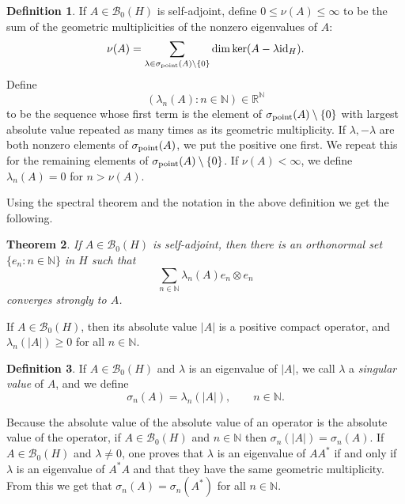 \documentclass{article}
\newcommand{\id}{\ensuremath\mathrm{id}}
\newcommand{\point}{\ensuremath\sigma_{\mathrm{point}}}
\newtheorem{theorem}{Theorem}
\theoremstyle{definition}
\newtheorem{definition}[theorem]{Definition}
\begin{document}
\begin{definition}
If $A \in \mathscr{B}_0(H)$ is self-adjoint, define $0 \leq \nu(A) \leq \infty$ to be the sum of the geometric multiplicities of the nonzero eigenvalues of $A$:
\[
\nu(A) = \sum_{\lambda \in \point(A) \setminus \{0\}} \dim \ker(A-\lambda \id_H).
\]
Define 
\[
(\lambda_n(A):n \in \mathbb{N}) \in \mathbb{R}^{\mathbb{N}}
\]
to be the sequence whose first term is the element of
$\point(A) \setminus \{0\}$ with
largest absolute value repeated as many times as its geometric multiplicity. If $\lambda,-\lambda$ are both  nonzero elements of $\point(A)$, we put the  positive one  first. We
repeat this for the remaining elements of $\point(A) \setminus \{0\}$.
If $\nu(A) < \infty$, we define $\lambda_n(A) = 0$ for $n>\nu(A)$.
\label{nudef}
\end{definition}

Using the spectral theorem and the notation in the above definition we get the following.

\begin{theorem}
If $A \in \mathscr{B}_0(H)$ is self-adjoint, then there is an orthonormal set $\{e_n: n \in \mathbb{N}\}$ in $H$ such that
\[
\sum_{n \in \mathbb{N}} \lambda_n(A) e_n \otimes e_n
\]
converges strongly to $A$.
\label{spectralsac}
\end{theorem}

If $A \in \mathscr{B}_0(H)$, then its absolute value $|A|$ is a positive compact operator, and $\lambda_n(|A|) \geq 0$ for all $n \in \mathbb{N}$. 

\begin{definition}
If $A \in \mathscr{B}_0(H)$ and
$\lambda$ is an eigenvalue of $|A|$, we call $\lambda$ a {\em singular
value} of $A$, and we define
\[
\sigma_n(A) = \lambda_n(|A|), \qquad n \in \mathbb{N}.
\]
\end{definition}

Because the absolute value of the absolute value of an operator is the absolute value of the operator, if $A \in \mathscr{B}_0(H)$ and $n \in \mathbb{N}$ then
$\sigma_n(|A|)=\sigma_n(A)$.
If $A \in \mathscr{B}_0(H)$ and
 $\lambda \neq 0$, one proves that $\lambda$ is an eigenvalue of $AA^*$ if and only if $\lambda$ is an eigenvalue of $A^*A$ and that they
have the same geometric multiplicity.
From this we get that $\sigma_n(A) = \sigma_n(A^*)$ for all $n \in \mathbb{N}$.
\end{document}
